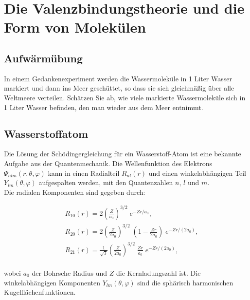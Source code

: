 \renewcommand{\lastmod}{\today}

\chapter{Die Valenzbindungstheorie und die Form von Molekülen}






\section{Aufwärmübung}


In einem Gedankenexperiment werden die Wassermoleküle in 1 Liter Wasser markiert und dann ins Meer geschüttet, so dass sie sich gleichmäßig über alle Weltmeere verteilen. Schätzen Sie ab, wie viele markierte Wassermoleküle sich in 1 Liter Wasser befinden, den man wieder aus dem Meer entnimmt.
	


\section{ Wasserstoffatom}


Die Lösung der Schödingergleichung für ein Wasserstoff-Atom ist eine bekannte Aufgabe aus der Quantenmechanik. Die Wellenfunktion des Elektrons $\Psi_{nlm}(r,\theta,\varphi)$ kann in einen Radialteil $R_{nl}(r)$ und einen winkelabhängigen Teil $Y_{lm}(\theta,\varphi)$ aufgespalten werden, mit den Quantenzahlen $n$, $l$ und $m$. \\

Die radialen Komponenten sind gegeben durch:

\begin{eqnarray*}
	& & R_{10}(r)=2 \left( \frac{Z}{a_0} \right) ^{3/2} \; e^ {-Zr/a_0}, \\
	& & R_{20}(r)=2 \left( \frac{Z}{2a_0}\right) ^{3/2}  \; \left( 1- { \frac{Zr}{2a_0} } \right) \; e^ {-Zr/(2a_0)}, \\
	& & R_{21}(r)= \frac{1}{\sqrt{3}}  \left( \frac{Z}{2a_0} \right) ^ {3/2} \;  {\frac{Zr}{a_0}} \; e^ {-Zr /(2a_0)}, \\
\end{eqnarray*}

wobei $a_0$ der Bohrsche Radius und $Z$ die Kernladungszahl ist. Die winkelabhängigen Komponenten $Y_{lm}(\theta,\varphi)$ sind die sphärisch harmonischen Kugelflächenfunktionen.

